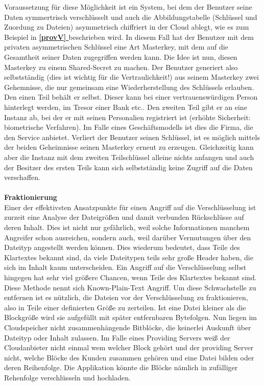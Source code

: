 \documentclass[13pt,a4paper,bibliography=totocnumbered,listof=totocnumbered]{scrartcl}
\newcommand*{\fullref}[1]{\textbf{\hyperref[{#1}]{\ref*{#1} \nameref*{#1}}}}
\begin{document}
Voraussetzung für diese Möglichkeit ist ein System, bei dem der Benutzer seine Daten symmertrisch verschlüsselt und auch die Abbildungstabelle (Schlüssel und Zuordung zu Dateien) asymmetrisch chiffriert in der Cloud ablegt, wie es zum Beispiel in \fullref{provV} beschrieben wird. In diesem Fall hat der Benutzer mit dem privaten asymmetrischen Schlüssel eine Art Masterkey, mit dem auf die Gesamtheit seiner Daten zugegriffen werden kann. Die Idee ist nun, diesen Masterkey zu einem Shared-Secret zu machen. Der Benutzer generiert also selbstständig (dies ist wichtig für die Vertraulichkeit!) aus seinem Masterkey zwei Gehemnisse, die nur gemeinsam eine Wiederherstellung des Schlüssels erlauben. Den einen Teil behält er selbst. Dieser kann bei einer vertrauenswürdigen Person hinterlegt werden, im Tresor einer Bank etc.. Den zweiten Teil gibt er an eine Instanz ab, bei der er mit seinen Personalien registriert ist (erhöhte Sicherheit: biometrische Verfahren). Im Falle eines Geschäftsmodells ist dies die Firma, die den Service anbietet. Verliert der Benutzer seinen Schlüssel, ist es möglich mittels der beiden Geheimnisse seinen Masterkey erneut zu erzeugen. Gleichzeitig kann aber die Instanz mit dem zweiten Teilschlüssel alleine nichts anfangen und auch der Besitzer des ersten Teils kann sich selbstständig keine Zugriff auf die Daten verschaffen. \cite{11}\\
\\\textbf{Fraktionierung}\\
Einer der effektivsten Ansatzpunkte für einen Angriff auf die Verschlüsselung ist zurzeit eine Analyse der Dateigrößen und damit verbunden Rückschlüsse auf deren Inhalt. Dies ist nicht nur gefährlich, weil solche Informationen manchem Angreifer schon ausreichen, sondern auch, weil darüber Vermutungen über den Dateityp angestellt werden können. Dies wiederum bedeutet, dass Teile des Klartextes bekannt sind, da viele Dateitypen teils sehr große Header haben, die sich im Inhalt kaum unterscheiden. Ein Angriff auf die Verschlüsselung selbst hingegen hat sehr viel größere Chancen, wenn Teile des Klartextes bekannt sind. Diese Methode nennt sich Known-Plain-Text Angriff. Um diese Schwachstelle zu entfernen ist es nützlich, die Dateien vor der Verschlüsselung zu fraktionieren, also in Teile einer definierten Größe zu zerteilen. Ist eine Datei kleiner als die Blockgröße wird sie aufgefüllt mit später entfernbaren Bytefolgen. Nun liegen im Cloudspeicher nicht zusammenhängende Bitblöcke, die keinerlei Auskunft über Dateityp oder Inhalt zulassen. Im Falle eines Providing Servers weiß der Cloudanbieter nicht einmal wem welcher Block gehört und der providing Server nicht, welche Blöcke des Kunden zusammen gehören und eine Datei bilden oder deren Reihenfolge. Die Applikation könnte die Blöcke nämlich in zufälliger Rehenfolge verschlüsseln und hochladen.\\
\end{document}
